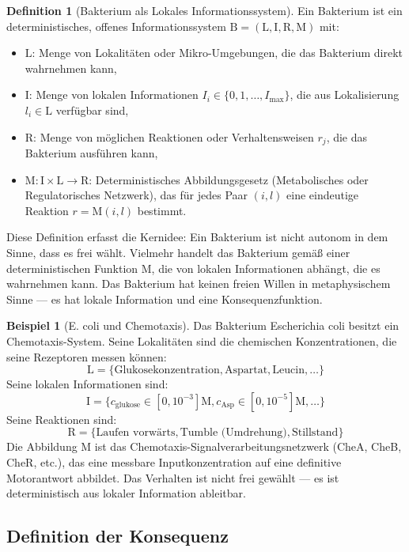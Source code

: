 \documentclass[a4paper,12pt]{article}
\theoremstyle{definition}
\newtheorem{definition}{Definition}
\newtheorem{beispiel}{Beispiel}
\begin{document}
\begin{definition}[Bakterium als Lokales Informationssystem]
Ein Bakterium ist ein deterministisches, offenes Informationssystem $\text{B} = (\text{L}, \text{I}, \text{R}, \text{M})$ mit:
\begin{itemize}
    \item[-] $\text{L}$: Menge von Lokalitäten oder Mikro-Umgebungen, die das Bakterium direkt wahrnehmen kann,
    \item[-] $\text{I}$: Menge von lokalen Informationen $I_i \in \{0, 1, \ldots, I_{\text{max}}\}$, die aus Lokalisierung $l_i \in \text{L}$ verfügbar sind,
    \item[-] $\text{R}$: Menge von möglichen Reaktionen oder Verhaltensweisen $r_j$, die das Bakterium ausführen kann,
    \item[-] $\text{M}: \text{I} \times \text{L} \to \text{R}$: Deterministisches Abbildungsgesetz (Metabolisches oder Regulatorisches Netzwerk), das für jedes Paar $(i, l)$ eine eindeutige Reaktion $r = \text{M}(i, l)$ bestimmt.
\end{itemize}
\end{definition}

Diese Definition erfasst die Kernidee: Ein Bakterium ist nicht autonom in dem Sinne, dass es frei wählt. Vielmehr handelt das Bakterium gemäß einer deterministischen Funktion $\text{M}$, die von lokalen Informationen abhängt, die es wahrnehmen kann. Das Bakterium hat keinen freien Willen in metaphysischem Sinne --- es hat lokale Information und eine Konsequenzfunktion.

\begin{beispiel}[E. coli und Chemotaxis]
Das Bakterium Escherichia coli besitzt ein Chemotaxis-System. Seine Lokalitäten sind die chemischen Konzentrationen, die seine Rezeptoren messen können:
\[
\text{L} = \{\text{Glukosekonzentration}, \text{Aspartat}, \text{Leucin}, \ldots\}
\]
Seine lokalen Informationen sind:
\[
\text{I} = \{c_{\text{glukose}} \in [0, 10^{-3}]\text{M}, c_{\text{Asp}} \in [0, 10^{-5}]\text{M}, \ldots\}
\]
Seine Reaktionen sind:
\[
\text{R} = \{\text{Laufen vorwärts}, \text{Tumble (Umdrehung)}, \text{Stillstand}\}
\]
Die Abbildung $\text{M}$ ist das Chemotaxis-Signalverarbeitungsnetzwerk (CheA, CheB, CheR, etc.), das eine messbare Inputkonzentration auf eine definitive Motorantwort abbildet. Das Verhalten ist nicht frei gewählt --- es ist deterministisch aus lokaler Information ableitbar.
\end{beispiel}

\subsection{Definition der Konsequenz}
\end{document}
